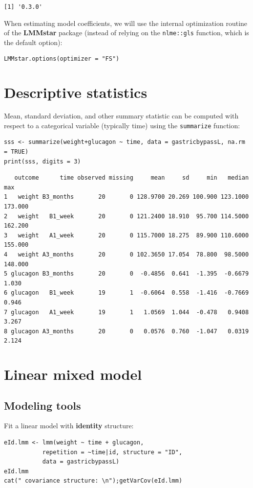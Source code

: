 \documentclass[12pt]{article}
\begin{document}
\begin{verbatim}
[1] '0.3.0'
\end{verbatim}


When estimating model coefficients, we will use the internal
optimization routine of the \textbf{LMMstar} package (instead of relying on
the \texttt{nlme::gls} function, which is the default option):
\lstset{language=r,label= ,caption= ,captionpos=b,numbers=none}
\begin{lstlisting}
LMMstar.options(optimizer = "FS")
\end{lstlisting}

\clearpage

\section{Descriptive statistics}
\label{sec:org2c98065}
Mean, standard deviation, and other summary statistic can be computed
with respect to a categorical variable (typically time) using the
\texttt{summarize} function:
\lstset{language=r,label= ,caption= ,captionpos=b,numbers=none}
\begin{lstlisting}
sss <- summarize(weight+glucagon ~ time, data = gastricbypassL, na.rm = TRUE)
print(sss, digits = 3)
\end{lstlisting}

\begin{verbatim}
   outcome      time observed missing     mean     sd     min   median     max
1   weight B3_months       20       0 128.9700 20.269 100.900 123.1000 173.000
2   weight   B1_week       20       0 121.2400 18.910  95.700 114.5000 162.200
3   weight   A1_week       20       0 115.7000 18.275  89.900 110.6000 155.000
4   weight A3_months       20       0 102.3650 17.054  78.800  98.5000 148.000
5 glucagon B3_months       20       0  -0.4856  0.641  -1.395  -0.6679   1.030
6 glucagon   B1_week       19       1  -0.6064  0.558  -1.416  -0.7669   0.946
7 glucagon   A1_week       19       1   1.0569  1.044  -0.478   0.9408   3.267
8 glucagon A3_months       20       0   0.0576  0.760  -1.047   0.0319   2.124
\end{verbatim}


\clearpage

\section{Linear mixed model}
\label{sec:org4a0a3de}
\subsection{Modeling tools}
\label{sec:orged1c313}
Fit a linear model with \textbf{identity} structure:
\lstset{language=r,label= ,caption= ,captionpos=b,numbers=none}
\begin{lstlisting}
eId.lmm <- lmm(weight ~ time + glucagon,
	       repetition = ~time|id, structure = "ID",
	       data = gastricbypassL)
eId.lmm
cat(" covariance structure: \n");getVarCov(eId.lmm)
\end{lstlisting}
\end{document}
